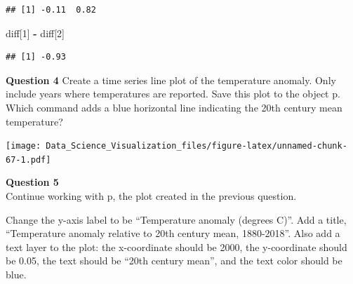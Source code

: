 \documentclass[
]{article}
\newenvironment{Shaded}{\begin{snugshade}}{\end{snugshade}}
\newcommand{\DataTypeTok}[1]{\textcolor[rgb]{0.13,0.29,0.53}{#1}}
\newcommand{\DecValTok}[1]{\textcolor[rgb]{0.00,0.00,0.81}{#1}}
\newcommand{\KeywordTok}[1]{\textcolor[rgb]{0.13,0.29,0.53}{\textbf{#1}}}
\newcommand{\NormalTok}[1]{#1}
\newcommand{\OperatorTok}[1]{\textcolor[rgb]{0.81,0.36,0.00}{\textbf{#1}}}
\newcommand{\StringTok}[1]{\textcolor[rgb]{0.31,0.60,0.02}{#1}}
\begin{document}
\begin{verbatim}
## [1] -0.11  0.82
\end{verbatim}

\begin{Shaded}
\begin{Highlighting}[]
\NormalTok{diff[}\DecValTok{1}\NormalTok{] }\OperatorTok{-}\StringTok{ }\NormalTok{diff[}\DecValTok{2}\NormalTok{]}
\end{Highlighting}
\end{Shaded}

\begin{verbatim}
## [1] -0.93
\end{verbatim}

\textbf{Question 4} Create a time series line plot of the temperature
anomaly. Only include years where temperatures are reported. Save this
plot to the object p.\\
Which command adds a blue horizontal line indicating the 20th century
mean temperature?

\begin{Shaded}
\end{Shaded}

\texttt{[image: Data\_Science\_Visualization\_files/figure-latex/unnamed-chunk-67-1.pdf]}

\textbf{Question 5}\\
Continue working with p, the plot created in the previous question.

Change the y-axis label to be ``Temperature anomaly (degrees C)''. Add a
title, ``Temperature anomaly relative to 20th century mean, 1880-2018''.
Also add a text layer to the plot: the x-coordinate should be 2000, the
y-coordinate should be 0.05, the text should be ``20th century mean'',
and the text color should be blue.
\end{document}
